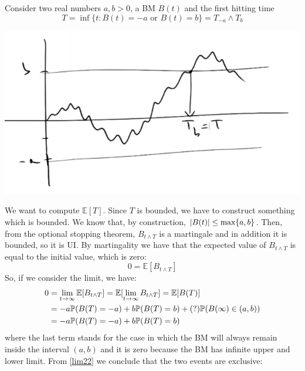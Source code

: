 \begin{example}{}{}{} %
    Consider two real numbers $a,b>0$, a BM $B(t)$ and the first hitting time
    \begin{equation}
        T = \inf\{t:B(t) = -a \text{ or } B(t) = b\} = T_{-a}\wedge T_{b}
    \end{equation}
    \begin{center}
        \includegraphics[scale=0.26]{fig/tmp/fig35.png}
    \end{center}
    We want to compute $\mathbb{E}[T]$. Since $T$ is bounded, we have to construct something which is bounded. We know that, by construction, $\abs{B(t)}\le\max\{a,b\}$. Then, from the optional stopping theorem, $B_{t\wedge T}$ is a martingale and in addition it is bounded, so it is UI. By martingality we have that the expected value of $B_{t\wedge T}$ is equal to the initial value, which is zero:
    \begin{equation*}
        0 = \mathbb{E}[B_{t\wedge T}] 
    \end{equation*}
    So, if we consider the limit, we have:
    \begin{align}\label{lim22}
        \notag 0 &= \lim_{t\to\infty}\mathbb{E}[B_{t\wedge T}] = \mathbb{E}[\lim_{t\to\infty} B_{t\wedge T}] = \mathbb{E}[B(T)] \\
        &=
        \notag -a\mathbb{P}(B(T)=-a) + b\mathbb{P}(B(T)=b) + (?)\mathbb{P}(B(\infty)\in(a,b)) \\
        &=
        -a\mathbb{P}(B(T)=-a) + b\mathbb{P}(B(T)=b)
    \end{align}
    where the last term stands for the case in which the BM will always remain inside the interval $(a,b)$ and it is zero because the BM has infinite upper and lower limit. From \eqref{lim22} we conclude that the two events are exclusive: 
    \begin{equation}

\end{equation}
\end{example}
